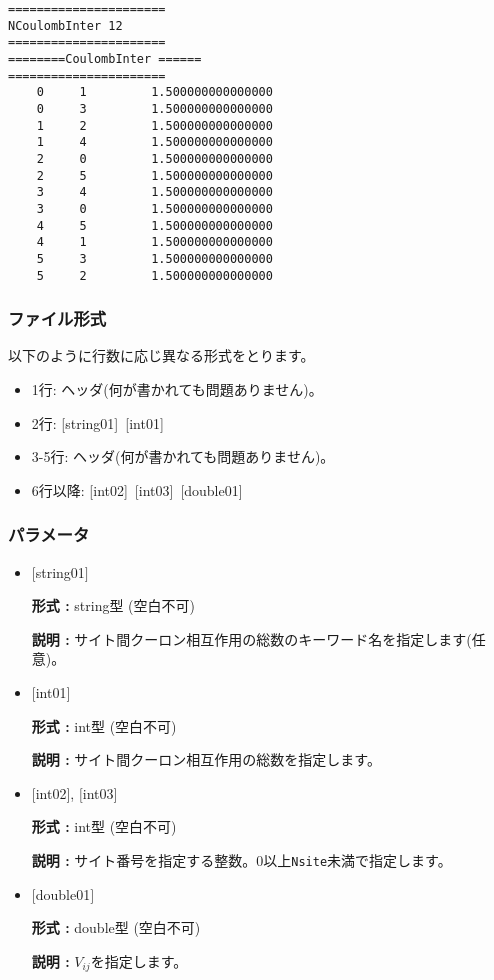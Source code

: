 \begin{minipage}{12.5cm}
\begin{screen}
\begin{verbatim}
====================== 
NCoulombInter 12  
====================== 
========CoulombInter ====== 
====================== 
    0     1         1.500000000000000
    0     3         1.500000000000000
    1     2         1.500000000000000
    1     4         1.500000000000000
    2     0         1.500000000000000
    2     5         1.500000000000000
    3     4         1.500000000000000
    3     0         1.500000000000000
    4     5         1.500000000000000
    4     1         1.500000000000000
    5     3         1.500000000000000
    5     2         1.500000000000000
\end{verbatim}
\end{screen}
\end{minipage}

\subsubsection{ファイル形式}
以下のように行数に応じ異なる形式をとります。
 \begin{itemize}
   \item  1行:  ヘッダ(何が書かれても問題ありません)。
   \item  2行:   [string01]~[int01]
   \item  3-5行:  ヘッダ(何が書かれても問題ありません)。
   \item  6行以降:
   [int02]~[int03]~[double01] 
  \end{itemize}
\subsubsection{パラメータ}
 \begin{itemize}

   \item  $[$string01$]$
   
    {\bf 形式 :} string型 (空白不可)

   {\bf 説明 :} サイト間クーロン相互作用の総数のキーワード名を指定します(任意)。

   \item  $[$int01$]$
   
    {\bf 形式 :} int型 (空白不可)

   {\bf 説明 :} サイト間クーロン相互作用の総数を指定します。

  \item  $[$int02$]$, $[$int03$]$
  
 {\bf 形式 :} int型 (空白不可)

{\bf 説明 :} サイト番号を指定する整数。0以上\verb|Nsite|{未満}で指定します。
 
 \item  $[$double01$]$
   
   {\bf 形式 :} double型 (空白不可)

  {\bf 説明 :}  $V_{ij}$を指定します。
  
\end{itemize}

